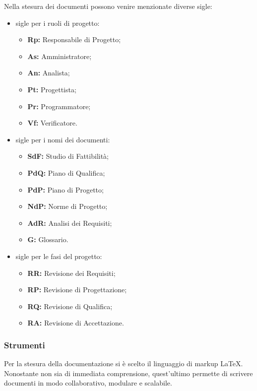         Nella stesura dei documenti possono venire menzionate diverse sigle:
        \begin{itemize}
          \item sigle per i ruoli di progetto:
            \begin{itemize}
              \item \textbf{Rp:} Responsabile di Progetto;
              \item \textbf{As:} Amministratore;
              \item \textbf{An:} Analista;
              \item \textbf{Pt:} Progettista;
              \item \textbf{Pr:} Programmatore;
              \item \textbf{Vf:} Verificatore.
            \end{itemize}
          \item sigle per i nomi dei documenti:
            \begin{itemize}
              \item \textbf{SdF:} Studio di Fattibilità;
              \item \textbf{PdQ:} Piano di Qualifica;
              \item \textbf{PdP:} Piano di Progetto;
              \item \textbf{NdP:} Norme di Progetto;
              \item \textbf{AdR:} Analisi dei Requisiti;
              \item \textbf{G:} Glossario.
            \end{itemize}
          \item sigle per le fasi del progetto:
            \begin{itemize}
              \item \textbf{RR:} Revisione dei Requisiti;
              \item \textbf{RP:} Revisione di Progettazione;
              \item \textbf{RQ:} Revisione di Qualifica;
              \item \textbf{RA:} Revisione di Accettazione.
            \end{itemize}
        \end{itemize}

    \subsubsection{Strumenti}
      \subsubsubsection{\LaTeX}
        Per la stesura della documentazione si è scelto il linguaggio di markup \LaTeX. Nonostante non sia di immediata comprensione, quest'ultimo permette di scrivere documenti in modo collaborativo, modulare e scalabile.

